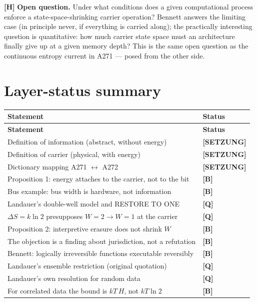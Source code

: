 \textbf{[H]} \textbf{Open question.} Under what conditions does a given computational
process enforce a state-space-shrinking carrier operation? Bennett answers the
limiting case (in principle never, if everything is carried along); the
practically interesting question is quantitative: how much carrier state space
must an architecture finally give up at a given memory depth? This is the same
open question as the continuous entropy current in A271 --- posed from the other
side.

\section{Layer-status summary}

\begin{center}
\small
\begin{longtable}{@{}p{}l@{}}
\toprule
\textbf{Statement} & \textbf{Status} \\
\midrule
\endfirsthead
\toprule
\textbf{Statement} & \textbf{Status} \\
\midrule
\endhead
Definition of information (abstract, without energy) & \textbf{[SETZUNG]} \\
Definition of carrier (physical, with energy) & \textbf{[SETZUNG]} \\
Dictionary mapping A271 $\leftrightarrow$ A272 & \textbf{[SETZUNG]} \\
Proposition 1: energy attaches to the carrier, not to the bit & \textbf{[B]} \\
Bus example: bus width is hardware, not information & \textbf{[B]} \\
Landauer's double-well model and \textup{RESTORE TO ONE} & \textbf{[Q]} \\
$\Delta S = k\ln 2$ presupposes $W{=}2 \to W{=}1$ at the carrier & \textbf{[Q]} \\
Proposition 2: interpretive erasure does not shrink $W$ & \textbf{[B]} \\
The objection is a finding about jurisdiction, not a refutation & \textbf{[B]} \\
Bennett: logically irreversible functions executable reversibly & \textbf{[B]} \\
Landauer's ensemble restriction (original quotation) & \textbf{[Q]} \\
Landauer's own resolution for random data & \textbf{[Q]} \\
For correlated data the bound is $kT\,H$, not $kT\ln 2$ & \textbf{[B]} \\

\end{longtable}
\end{center}
